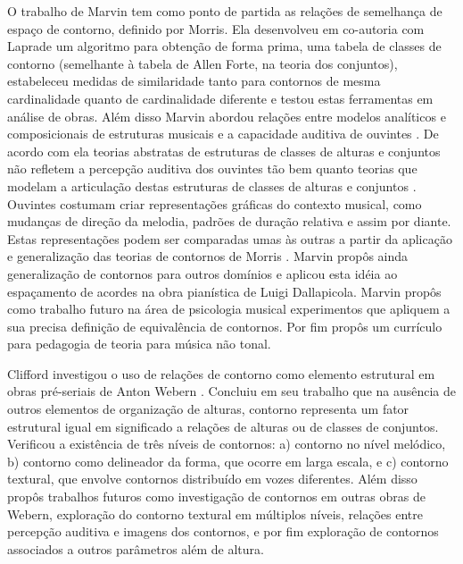 \documentclass[12pt]{article}
\begin{document}
O trabalho de Marvin tem como ponto de partida as relações de
semelhança de espaço de contorno, definido por Morris. Ela desenvolveu
em co-autoria com Laprade \cite{marvin.ea87:relating} um algoritmo
para obtenção de forma prima, uma tabela de classes de contorno
(semelhante à tabela de Allen Forte, na teoria dos conjuntos),
estabeleceu medidas de similaridade tanto para contornos de mesma
cardinalidade quanto de cardinalidade diferente e testou estas
ferramentas em análise de obras. Além disso Marvin abordou relações
entre modelos analíticos e composicionais de estruturas musicais e a
capacidade auditiva de ouvintes \cite{marvin88:generalized}. De acordo
com ela teorias abstratas de estruturas de classes de alturas e
conjuntos não refletem a percepção auditiva dos ouvintes tão bem
quanto teorias que modelam a articulação destas estruturas de classes
de alturas e conjuntos \cite[p. 228]{marvin88:generalized}. Ouvintes
costumam criar representações gráficas do contexto musical, como
mudanças de direção da melodia, padrões de duração relativa e assim
por diante. Estas representações podem ser comparadas umas às outras a
partir da aplicação e generalização das teorias de contornos de Morris
\cite[p. 229]{marvin88:generalized}. Marvin propôs ainda generalização
de contornos para outros domínios e aplicou esta idéia ao espaçamento
de acordes na obra pianística de Luigi Dallapicola. Marvin propôs como
trabalho futuro na área de psicologia musical experimentos que
apliquem a sua precisa definição de equivalência de contornos. Por fim
propôs um currículo para pedagogia de teoria para música não tonal.



Clifford investigou o uso de relações de contorno como elemento
estrutural em obras pré-seriais de Anton Webern
\cite{clifford95:contour}. Concluiu em seu trabalho que na ausência de
outros elementos de organização de alturas, contorno representa um
fator estrutural igual em significado a relações de alturas ou de
classes de conjuntos. Verificou a existência de três níveis de
contornos: a) contorno no nível melódico, b) contorno como delineador
da forma, que ocorre em larga escala, e c) contorno textural, que
envolve contornos distribuído em vozes diferentes. Além disso propôs
trabalhos futuros como investigação de contornos em outras obras de
Webern, exploração do contorno textural em múltiplos níveis, relações
entre percepção auditiva e imagens dos contornos, e por fim exploração
de contornos associados a outros parâmetros além de altura.
\end{document}
